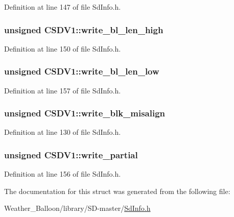 Definition at line 147 of file Sd\+Info.\+h.

\subsubsection[{\texorpdfstring{write\+\_\+bl\+\_\+len\+\_\+high}{write\_bl\_len\_high}}]{\setlength{\rightskip}{0pt plus 5cm}unsigned C\+S\+D\+V1\+::write\+\_\+bl\+\_\+len\+\_\+high}\hypertarget{struct_c_s_d_v1_a1ec000b74733f3d16e105352ba26f177}{}\label{struct_c_s_d_v1_a1ec000b74733f3d16e105352ba26f177}


Definition at line 150 of file Sd\+Info.\+h.

\subsubsection[{\texorpdfstring{write\+\_\+bl\+\_\+len\+\_\+low}{write\_bl\_len\_low}}]{\setlength{\rightskip}{0pt plus 5cm}unsigned C\+S\+D\+V1\+::write\+\_\+bl\+\_\+len\+\_\+low}\hypertarget{struct_c_s_d_v1_a57c6fb1515a4377af6c642c5d66f7a35}{}\label{struct_c_s_d_v1_a57c6fb1515a4377af6c642c5d66f7a35}


Definition at line 157 of file Sd\+Info.\+h.

\subsubsection[{\texorpdfstring{write\+\_\+blk\+\_\+misalign}{write\_blk\_misalign}}]{\setlength{\rightskip}{0pt plus 5cm}unsigned C\+S\+D\+V1\+::write\+\_\+blk\+\_\+misalign}\hypertarget{struct_c_s_d_v1_a7d2f58a9c9b9447344ce5bdf3a8ffaa3}{}\label{struct_c_s_d_v1_a7d2f58a9c9b9447344ce5bdf3a8ffaa3}


Definition at line 130 of file Sd\+Info.\+h.

\subsubsection[{\texorpdfstring{write\+\_\+partial}{write\_partial}}]{\setlength{\rightskip}{0pt plus 5cm}unsigned C\+S\+D\+V1\+::write\+\_\+partial}\hypertarget{struct_c_s_d_v1_a24149a92c75ebed1c824e4301e1fad40}{}\label{struct_c_s_d_v1_a24149a92c75ebed1c824e4301e1fad40}


Definition at line 156 of file Sd\+Info.\+h.



The documentation for this struct was generated from the following file\+:\begin{DoxyCompactItemize}
\item 
Weather\+\_\+\+Balloon/library/\+S\+D-\/master/\hyperlink{_sd_info_8h}{Sd\+Info.\+h}\end{DoxyCompactItemize}
